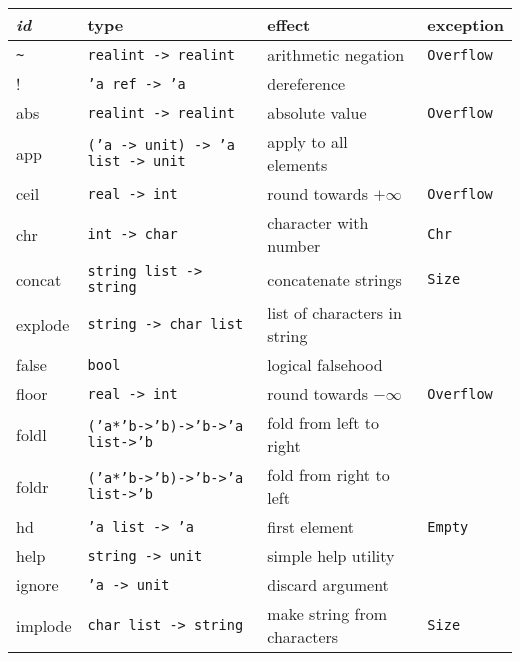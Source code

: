 \documentclass[fleqn]{article}
\begin{document}
\begin{tabular}{@{\tt\ \ }llll}\hline
{\it id\/}  &  type &     effect & exception \\\hline

\verb#~#    & {\tt realint -> realint}  &           arithmetic negation
        & {\tt Overflow}\\

!           & {\tt 'a ref -> 'a} &        dereference\\

abs         & {\tt realint -> realint}  & absolute value & {\tt Overflow}\\

app         & {\tt ('a -> unit) -> 'a list -> unit} 
        & apply to all elements\\

ceil       & {\tt real -> int} &           round towards $+\infty$ 
        & {\tt Overflow}\\

chr         & {\tt int -> char} &           character with number &
{\tt Chr}\\

concat      & {\tt string list -> string} & concatenate strings 
& {\tt Size}\\

explode     & {\tt string -> char list} &   list of characters in string\\

false       & {\tt bool} & logical falsehood\\

floor       & {\tt real -> int} &           round towards $-\infty$ 
        & {\tt Overflow}\\

foldl       & {\tt ('a*'b->'b)->'b->'a list->'b}
        & fold from left to right\\

foldr       & {\tt ('a*'b->'b)->'b->'a list->'b}
        & fold from right to left\\

hd          & {\tt 'a list -> 'a}         & first element & {\tt Empty}\\

help        & {\tt string -> unit}        & simple help utility\\

ignore      & {\tt 'a -> unit} &            discard argument\\

implode     & {\tt char list -> string} &   make string from
characters & {\tt Size}\\


\end{tabular}
\end{document}
